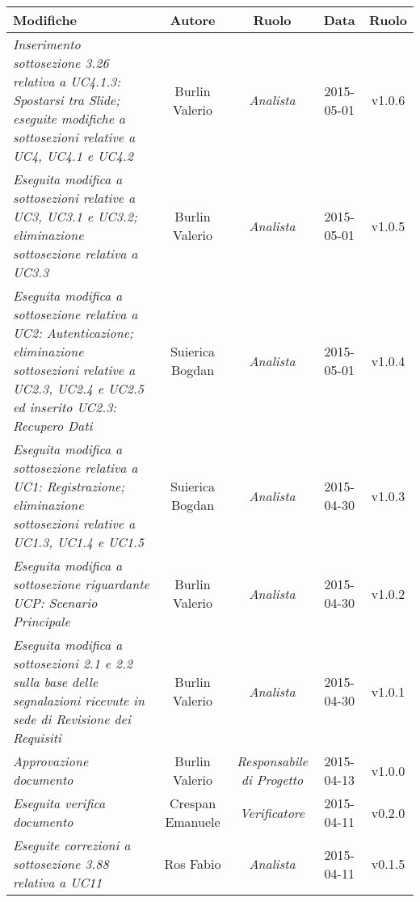 \newpage
\begin{table}[h]
\centering
\begin{tabular}{|p{}|c|c|c|c|}
	\toprule
		\textbf{Modifiche} & \textbf{Autore} & \textbf{Ruolo} & \textbf{Data} & \textbf{Ruolo} \\
	\midrule
	\midrule
		\textit{Inserimento sottosezione 3.26 relativa a UC4.1.3: Spostarsi tra Slide; eseguite modifiche a sottosezioni relative a UC4, UC4.1 e UC4.2} & Burlin Valerio & \textit{Analista} & 2015-05-01 & v1.0.6 \\ 
	\midrule
		\textit{Eseguita modifica a sottosezioni relative a UC3, UC3.1 e UC3.2; eliminazione sottosezione relativa a UC3.3} & Burlin Valerio & \textit{Analista} & 2015-05-01 & v1.0.5 \\
	\midrule
		\textit{Eseguita modifica a sottosezione relativa a UC2: Autenticazione; eliminazione sottosezioni relative a UC2.3, UC2.4 e UC2.5 ed inserito UC2.3: Recupero Dati} & Suierica Bogdan & \textit{Analista} & 2015-05-01 & v1.0.4 \\ 
	\midrule
		\textit{Eseguita modifica a sottosezione relativa a UC1: Registrazione; eliminazione sottosezioni relative a UC1.3, UC1.4 e UC1.5} & Suierica Bogdan & \textit{Analista} & 2015-04-30 & v1.0.3 \\
	\midrule
		\textit{Eseguita modifica a sottosezione riguardante UCP: Scenario Principale} & Burlin Valerio & \textit{Analista} & 2015-04-30 & v1.0.2 \\
	\midrule
		\textit{Eseguita modifica a sottosezioni 2.1 e 2.2 sulla base delle segnalazioni ricevute in sede di Revisione dei Requisiti} & Burlin Valerio & \textit{Analista} & 2015-04-30 & v1.0.1 \\
	\midrule
		\textit{Approvazione documento} & Burlin Valerio & \textit{Responsabile di Progetto} & 2015-04-13 & v1.0.0 \\
	\midrule
		\textit{Eseguita verifica documento} & Crespan Emanuele & \textit{Verificatore} & 2015-04-11 & v0.2.0 \\
	\midrule
		\textit{Eseguite correzioni a sottosezione 3.88 relativa a UC11} & Ros Fabio & \textit{Analista} & 2015-04-11 & v0.1.5 \\
	\bottomrule
\end{tabular}	
\end{table}
\newpage
